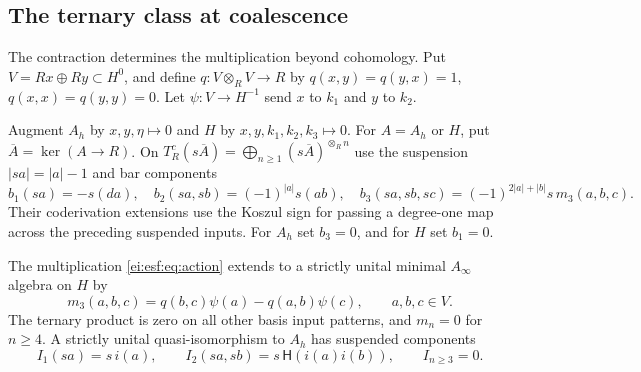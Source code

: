 \subsection{The ternary class at coalescence}

The contraction determines the multiplication beyond
cohomology. Put $V=Rx\oplus Ry\subset H^0$, and define
$q:V\otimes_R V\to R$ by
$q(x,y)=q(y,x)=1$, $q(x,x)=q(y,y)=0$.
Let $\psi:V\to H^{-1}$ send $x$ to $k_1$ and $y$ to $k_2$.

Augment $A_h$ by $x,y,\eta\mapsto0$ and $H$ by
$x,y,k_1,k_2,k_3\mapsto0$.
For $A=A_h$ or $H$, put $\overline A=\ker(A\to R)$.
On $T^c_R(s\overline A)=\bigoplus_{n\ge1}
(s\overline A)^{\otimes_Rn}$ use the suspension
$|sa|=|a|-1$ and bar components
\[
 b_1(sa)=-s(da),\quad
 b_2(sa,sb)=(-1)^{|a|}s(ab),\quad
 b_3(sa,sb,sc)=(-1)^{2|a|+|b|}s\,m_3(a,b,c).
\]
Their coderivation extensions use the Koszul sign for
passing a degree-one map across the preceding suspended
inputs. For $A_h$ set $b_3=0$, and for $H$ set $b_1=0$.

\begin{theorem}\label{ei:esf:thm:minimal}
The multiplication \eqref{ei:esf:eq:action} extends to a
strictly unital minimal $A_\infty$ algebra on $H$ by
\begin{equation}\label{ei:esf:eq:ternary}
 m_3(a,b,c)=q(b,c)\psi(a)-q(a,b)\psi(c),\qquad a,b,c\in V.
\end{equation}
The ternary product is zero on all other basis input
patterns, and $m_n=0$ for $n\ge4$.
A strictly unital quasi-isomorphism to $A_h$ has suspended
components
\[
 I_1(sa)=s\,i(a),\qquad
 I_2(sa,sb)=s\,\mathsf H(i(a)i(b)),\qquad I_{n\ge3}=0.
\]
\end{theorem}

